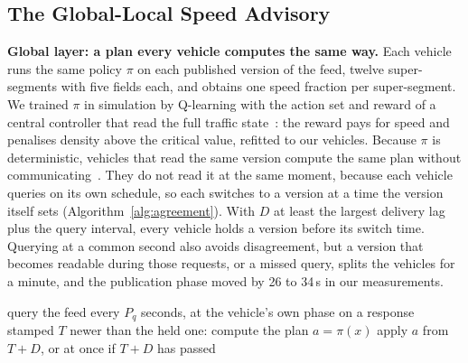 \subsection{The Global-Local Speed Advisory}
\label{sec:controller}

\noindent\textbf{Global layer: a plan every vehicle computes the same way.} Each vehicle runs the same policy $\pi$ on each published version of the feed, twelve super-segments with five fields each, and obtains one speed fraction per super-segment. We trained $\pi$ in simulation by Q-learning with the action set and reward of a central controller that read the full traffic state~\cite{self_regulating_cars}: the reward pays for speed and penalises density above the critical value, refitted to our vehicles. Because $\pi$ is deterministic, vehicles that read the same version compute the same plan without communicating~\cite{nayyar2013common}. They do not read it at the same moment, because each vehicle queries on its own schedule, so each switches to a version at a time the version itself sets (Algorithm~\ref{alg:agreement}). With $D$ at least the largest delivery lag plus the query interval, every vehicle holds a version before its switch time. Querying at a common second also avoids disagreement, but a version that becomes readable during those requests, or a missed query, splits the vehicles for a minute, and the publication phase moved by 26 to 34\,s in our measurements.

\begin{algorithm}[t]
\caption{Version-keyed plan, run on every vehicle}
\label{alg:agreement}
\begin{algorithmic}[1]
\State query the feed every $P_q$ seconds, at the vehicle's own phase
\State on a response stamped $T$ newer than the held one: compute the plan $a=\pi(x)$
\State apply $a$ from $T+D$, or at once if $T+D$ has passed
\end{algorithmic}
\end{algorithm}

